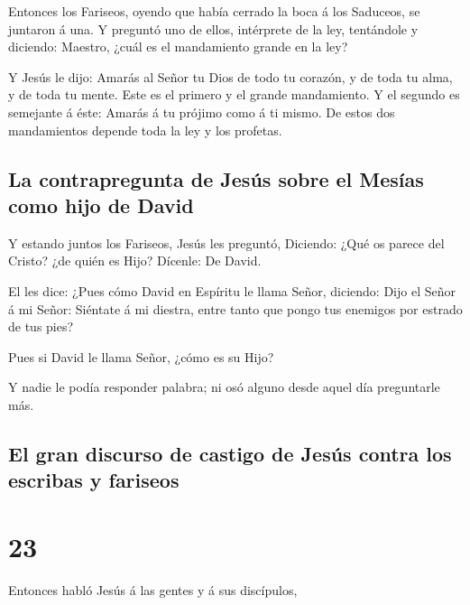  Entonces los Fariseos, oyendo que había cerrado la boca á
los Saduceos, se juntaron á una.  Y preguntó uno de ellos,
intérprete de la ley, tentándole y diciendo:  Maestro,
¿cuál es el mandamiento grande en la ley?

 Y Jesús le dijo: Amarás al Señor tu Dios de todo tu
corazón, y de toda tu alma, y de toda tu mente.  Este es el
primero y el grande mandamiento.  Y el segundo es semejante
á éste: Amarás á tu prójimo como á ti mismo.  De estos dos
mandamientos depende toda la ley y los profetas.

\hypertarget{la-contrapregunta-de-jesuxfas-sobre-el-mesuxedas-como-hijo-de-david}{%
\subsection{La contrapregunta de Jesús sobre el Mesías como hijo de
David}\label{la-contrapregunta-de-jesuxfas-sobre-el-mesuxedas-como-hijo-de-david}}

 Y estando juntos los Fariseos, Jesús les preguntó,
 Diciendo: ¿Qué os parece del Cristo? ¿de quién es Hijo?
Dícenle: De David.

 El les dice: ¿Pues cómo David en Espíritu le llama Señor,
diciendo:  Dijo el Señor á mi Señor: Siéntate á mi diestra,
entre tanto que pongo tus enemigos por estrado de tus pies?

 Pues si David le llama Señor, ¿cómo es su Hijo?

 Y nadie le podía responder palabra; ni osó alguno desde
aquel día preguntarle más.

\hypertarget{el-gran-discurso-de-castigo-de-jesuxfas-contra-los-escribas-y-fariseos}{%
\subsection{El gran discurso de castigo de Jesús contra los escribas y
fariseos}\label{el-gran-discurso-de-castigo-de-jesuxfas-contra-los-escribas-y-fariseos}}

\hypertarget{section-22}{%
\section{23}\label{section-22}}

 Entonces habló Jesús á las gentes y á sus discípulos,

